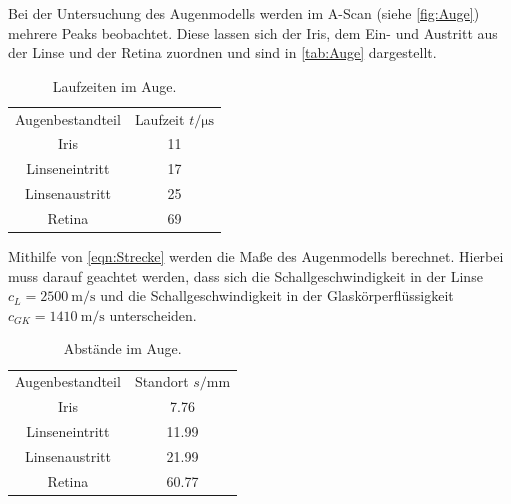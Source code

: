 Bei der Untersuchung des Augenmodells werden im A-Scan (siehe \autoref{fig:Auge}) mehrere Peaks beobachtet.
Diese lassen sich der Iris, dem Ein- und Austritt aus der Linse und der Retina zuordnen und sind in \autoref{tab:Auge} dargestellt.
\begin{table}[H]
  \centering
  \caption{Laufzeiten im Auge.}
  \label{tab:Auge}
  \begin{tabular}{c S[table-format=2.0] }
  \toprule
  {Augenbestandteil} & {Laufzeit $t / \si{\micro\second}$} \\
    Iris            &  11 \\
    Linseneintritt  &  17 \\
    Linsenaustritt  &  25 \\
    Retina          &  69 \\

  \bottomrule
  \end{tabular}
\end{table}

Mithilfe von \autoref{eqn:Strecke} werden die Maße des Augenmodells berechnet. Hierbei muss darauf geachtet werden, dass sich
die Schallgeschwindigkeit in der Linse $c_L= \qty{2500}{\meter\per\second}$ und die Schallgeschwindigkeit in der Glaskörperflüssigkeit
$c_{GK}= \qty{1410}{\meter\per\second}$ unterscheiden.

\begin{table}[H]
  \centering
  \caption{Abstände im Auge.}
  \label{tab:Auge}
  \begin{tabular}{c S[table-format=2.2] }
  \toprule
  {Augenbestandteil} & {Standort $s / \si{\milli\meter}$} \\
  Iris            &  7.76\\
  Linseneintritt  &  11.99\\
  Linsenaustritt  &  21.99\\
  Retina          &  60.77\\
  \bottomrule
  \end{tabular}
\end{table}